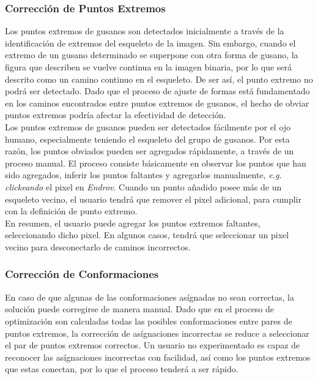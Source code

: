 \subsubsection*{Correcci\'on de Puntos Extremos}
\label{sec:endpointop}

Los puntos extremos de gusanos son detectados inicialmente a trav\'es de la
identificaci\'on de extremos del esqueleto de la imagen. Sin embargo, cuando
el extremo de un gusano determinado se superpone con otra forma de gusano, la
figura que describen se vuelve continua en la imagen binaria, por lo que ser\'a
descrito como un camino continuo en el esqueleto. De ser as\'i, el punto 
extremo no podr\'a ser detectado. Dado que el proceso de ajuste de formas est\'a 
fundamentado en los caminos encontrados entre puntos extremos de gusanos, el hecho de obviar
puntos extremos podr\'ia afectar la efectividad de detecci\'on.\\

Los puntos extremos de gusanos pueden ser detectados f\'acilmente por el ojo humano, 
especialmente teniendo el esqueleto del grupo de gusanos. Por esta raz\'on, los puntos
obviados pueden ser agregados r\'apidamente, a trav\'es de un proceso manual. El proceso
consiste b\'asicamente en observar los puntos que han sido agregados, inferir los
puntos faltantes y agregarlos manualmente, \emph{e.g.} \emph{clickeando} el pixel
en \emph{Endrov}. Cuando un punto a\~nadido posee m\'as de un esqueleto vecino, el
usuario tendr\'a que remover el pixel adicional, para cumplir con la
definici\'on de punto extremo.\\

En resumen, el usuario puede agregar los puntos extremos faltantes, seleccionando
dicho pixel. En algunos casos, tendr\'a que seleccionar un pixel vecino para
desconectarlo de caminos incorrectos.

\subsubsection*{Correcci\'on de Conformaciones}
\label{sec:matchfix}

En caso de que algunas de las conformaciones as\'ignadas no sean correctas,
la soluci\'on puede corregirse de manera manual. Dado que en el proceso de
optimizaci\'on son calculadas todas las posibles conformaciones entre
pares de puntos extremos, la correcci\'on de as\'ignaciones incorrectas
se reduce a seleccionar el par de puntos extremos correctos. 
Un usuario no experimentado es capaz de reconocer las as\'ignaciones incorrectas
con facilidad, as\'i como los puntos extremos que estas conectan, por lo que
el proceso tender\'a a ser r\'apido.
